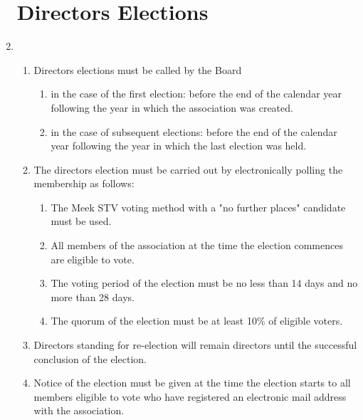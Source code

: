 \begin{enumerate}
\section{Directors Elections}
\item
  \begin{enumerate}
    \item Directors elections must be called by the Board
      \begin{enumerate}
        \item in the case of the first election: before the end of the calendar year following
                the year in which the association was created.
        \item in the case of subsequent elections: before the end of the calendar year following
                the year in which the last election was held.
      \end{enumerate}
    \item
      The directors election must be carried out by electronically polling the membership as follows:
      \begin{enumerate}
        \item The Meek STV voting method with a "no further places" candidate must be used.
        \item All members of the association at the time the election commences are eligible to vote.
        \item The voting period of the election must be no less than 14 days and no more than 28 days.
        \item The quorum of the election must be at least 10\% of eligible voters.
      \end{enumerate}
    \item Directors standing for re-election will remain directors until the successful conclusion
          of the election.
    \item Notice of the election must be given at the time the election starts to all members eligible
          to vote who have registered an electronic mail address with the association.
   \end{enumerate}


\end{enumerate}
